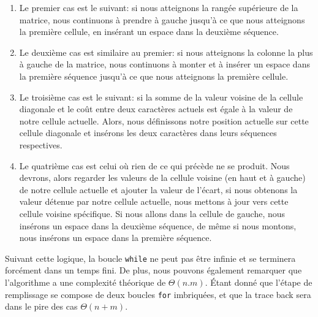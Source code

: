 \documentclass[12pt]{article}
\begin{document}
\begin{enumerate}
    \item Le premier cas est le suivant: si nous atteignons la rangée supérieure de la matrice, nous continuons à prendre à gauche jusqu'à ce que nous atteignons la première cellule, en insérant un espace dans la deuxième séquence.
    \item Le deuxième cas est similaire au premier: si nous atteignons la colonne la plus à gauche de la matrice, nous continuons à monter et à insérer un espace dans la première séquence jusqu'à ce que nous atteignons la première cellule.
    \item Le troisième cas est le suivant: si la somme de la valeur voisine de la cellule diagonale et le coût entre deux caractères actuels est égale à la valeur de notre cellule actuelle. Alors, nous définissons notre position actuelle sur cette cellule diagonale et insérons les deux caractères dans leurs séquences respectives.
    \item Le quatrième cas est celui où rien de ce qui précède ne se produit. Nous devrons, alors regarder les valeurs de la cellule voisine (en haut et à gauche) de notre cellule actuelle et ajouter la valeur de l'écart, si nous obtenons la valeur détenue par notre cellule actuelle, nous mettons à jour vers cette cellule voisine spécifique. Si nous allons dans la cellule de gauche, nous insérons un espace dans la deuxième séquence, de même si nous montons, nous insérons un espace dans la première séquence.
\end{enumerate}
Suivant cette logique, la boucle \texttt{while} ne peut pas être infinie et se terminera forcément dans un temps fini. De plus, nous pouvons également remarquer que l'algorithme a une complexité théorique de $\Theta(n.m)$. Étant donné que l'étape de remplissage se compose de deux boucles \texttt{for} imbriquées, et que la trace back sera dans le pire des cas $\Theta(n + m)$.

\end{document}
